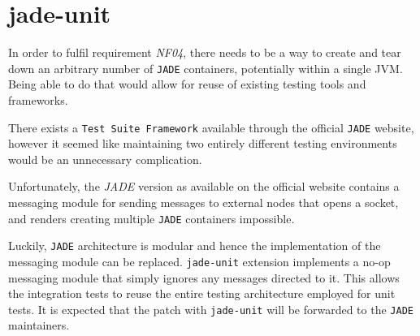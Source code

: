 \section{jade-unit}
In order to fulfil requirement \textit{NF04}, there needs to be a way to create and tear down an arbitrary number of \texttt{JADE} containers, potentially within a single JVM. Being able to do that would allow for reuse of existing testing tools and frameworks. 

There exists a \texttt{Test Suite Framework} available through the official \texttt{JADE} website, however it seemed like maintaining two entirely different testing environments would be an unnecessary complication.

Unfortunately, the \textit{JADE} version as available on the official website contains a messaging module for sending messages to external nodes that opens a socket, and renders creating multiple \texttt{JADE} containers impossible.

Luckily, \texttt{JADE} architecture is modular and hence the implementation of the messaging module can be replaced. \texttt{jade-unit} extension implements a no-op messaging module that simply ignores any messages directed to it. This allows the integration tests to reuse the entire testing architecture employed for unit tests. It is expected that the patch with \texttt{jade-unit} will be forwarded to the \texttt{JADE} maintainers.
